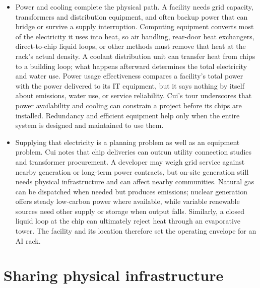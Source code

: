 \documentclass[10pt]{article}
\begin{document}
\begin{itemize}[leftmargin=1.25em, itemsep=0.3em, parsep=0pt, topsep=0pt]
    \item Power and cooling complete the physical path. A facility needs grid capacity, transformers and distribution equipment, and often backup power that can bridge or survive a supply interruption. Computing equipment converts most of the electricity it uses into heat, so air handling, rear-door heat exchangers, direct-to-chip liquid loops, or other methods must remove that heat at the rack's actual density. A coolant distribution unit can transfer heat from chips to a building loop; what happens afterward determines the total electricity and water use. Power usage effectiveness compares a facility's total power with the power delivered to its IT equipment, but it says nothing by itself about emissions, water use, or service reliability. Cui's tour underscores that power availability and cooling can constrain a project before its chips are installed. Redundancy and efficient equipment help only when the entire system is designed and maintained to use them.

    \item Supplying that electricity is a planning problem as well as an equipment problem. Cui notes that chip deliveries can outrun utility connection studies and transformer procurement. A developer may weigh grid service against nearby generation or long-term power contracts, but on-site generation still needs physical infrastructure and can affect nearby communities. Natural gas can be dispatched when needed but produces emissions; nuclear generation offers steady low-carbon power where available, while variable renewable sources need other supply or storage when output falls. Similarly, a closed liquid loop at the chip can ultimately reject heat through an evaporative tower. The facility and its location therefore set the operating envelope for an AI rack.
\end{itemize}

\newpage
\section*{Sharing physical infrastructure}
\end{document}
